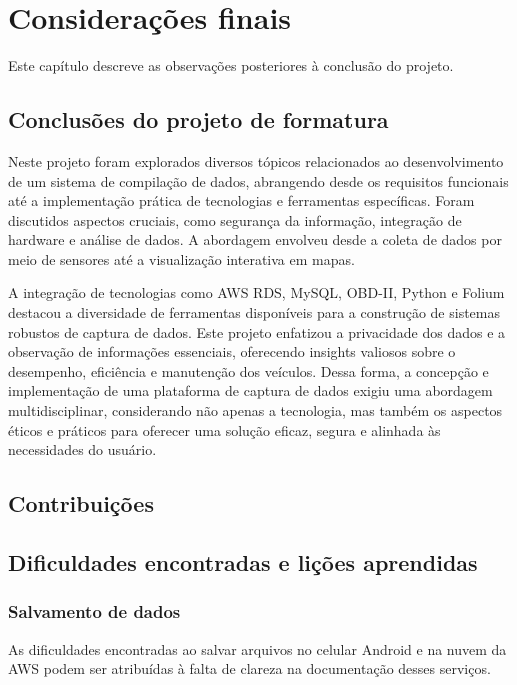 \chapter{Considerações finais}

Este capítulo descreve as observações posteriores à conclusão do projeto.

\section{Conclusões do projeto de formatura}
Neste projeto foram explorados diversos tópicos relacionados ao desenvolvimento de um sistema de compilação de dados, abrangendo desde os requisitos funcionais até a implementação prática de tecnologias e ferramentas específicas. Foram discutidos aspectos cruciais, como segurança da informação, integração de hardware e análise de dados. A abordagem envolveu desde a coleta de dados por meio de sensores até a visualização interativa em mapas. 

A integração de tecnologias como AWS RDS, MySQL, OBD-II, Python e Folium destacou a diversidade de ferramentas disponíveis para a construção de sistemas robustos de captura de dados. Este projeto enfatizou a privacidade dos dados e a  observação de informações essenciais, oferecendo insights valiosos sobre o desempenho, eficiência e manutenção dos veículos. Dessa forma, a concepção e implementação de uma plataforma de captura de dados exigiu uma abordagem multidisciplinar, considerando não apenas a tecnologia, mas também os aspectos éticos e práticos para oferecer uma solução eficaz, segura e alinhada às necessidades do usuário.

\section{Contribuições}

\section{Dificuldades encontradas e lições aprendidas}

\subsection{Salvamento de dados}
    
    As dificuldades encontradas ao salvar arquivos no celular Android e na nuvem da AWS podem ser atribuídas à falta de clareza na documentação desses serviços.
    
